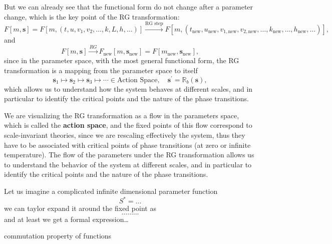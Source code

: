 But we can already see that the functional form do not change after a parameter change, which is the key point of the RG transformation:
\[
    F[m, \mathbf{s}] = F[m, (t,u,v_1,v_2,\dots, k, L, h, \dots)] \xrightarrow{\text{RG step}} F[m, (t_{\text{new}}, u_{\text{new}}, v_{1,\text{new}}, v_{2,\text{new}}, \dots, k_{\text{new}}, \dots, h_{\text{new}}, \dots)],
\]
and
\[
    F[m, \mathbf{s}] \xrightarrow{RG} F_\text{new}[m, \mathbf{s}_{\text{new}}] = F[m_{\text{new}}, \mathbf{s}_{\text{new}}],
\]
since in the parameter space, with the most general functional form, the RG transformation is a mapping from the parameter space to itself
\[
    \mathbf{s}_1 \mapsto \mathbf{s}_2 \mapsto \mathbf{s}_3 \mapsto \cdots \in \text{Action Space}, \quad \mathbf{s}^{\prime} = \mathbb{R}_b(\mathbf{s}),
\]
which allows us to understand how the system behaves at different scales, and in particular to identify the critical points and the nature of the phase transitions.

We are visualizing the RG transformation as a flow in the parameters space, which is called the \textbf{action space}, and the fixed points of this flow correspond to scale-invariant theories, since we are rescaling effectively the system, thus they have to be associated with critical points of phase transitions (at zero or infinite temperature). The flow of the parameters under the RG transformation allows us to understand the behavior of the system at different scales, and in particular to identify the critical points and the nature of the phase transitions.

Let us imagine a complicated infinite dimensional parameter function
\[
    S^* = \dots
\]
we can taylor expand it around the fixed point as
\[
    \dots \dots \dots
\]
and at least we get a formal expression\dots

commutation property of functions

